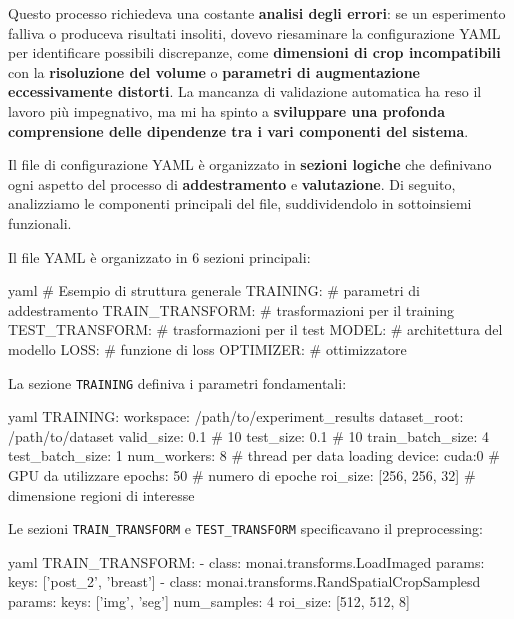 Questo processo richiedeva una costante \textbf{analisi degli errori}: se un esperimento falliva o produceva risultati insoliti, dovevo riesaminare la configurazione YAML per identificare possibili discrepanze, come \textbf{dimensioni di crop incompatibili} con la \textbf{risoluzione del volume} o \textbf{parametri di augmentazione eccessivamente distorti}. La mancanza di validazione automatica ha reso il lavoro più impegnativo, ma mi ha spinto a \textbf{sviluppare una profonda comprensione delle dipendenze tra i vari componenti del sistema}.


Il file di configurazione YAML è organizzato in \textbf{sezioni logiche} che definivano ogni aspetto del processo di \textbf{addestramento} e \textbf{valutazione}. Di seguito, analizziamo le componenti principali del file, suddividendolo in sottoinsiemi funzionali.

Il file YAML è organizzato in 6 sezioni principali:

\begin{code}{yaml}
# Esempio di struttura generale
TRAINING:
  # parametri di addestramento
TRAIN_TRANSFORM:
  # trasformazioni per il training
TEST_TRANSFORM:
  # trasformazioni per il test
MODEL:
  # architettura del modello
LOSS:
  # funzione di loss
OPTIMIZER:
  # ottimizzatore
\end{code}

La sezione \texttt{TRAINING} definiva i parametri fondamentali:

\begin{code}{yaml}
TRAINING:
  workspace: /path/to/experiment_results
  dataset_root: /path/to/dataset
  valid_size: 0.1  # 10%
  test_size: 0.1   # 10%
  train_batch_size: 4
  test_batch_size: 1 
  num_workers: 8    # thread per data loading
  device: cuda:0    # GPU da utilizzare
  epochs: 50        # numero di epoche
  roi_size: [256, 256, 32]  # dimensione regioni di interesse
\end{code}


Le sezioni \texttt{TRAIN\_TRANSFORM} e \texttt{TEST\_TRANSFORM} specificavano il preprocessing:

\begin{code}{yaml}
TRAIN_TRANSFORM:
  - class: monai.transforms.LoadImaged
    params:
      keys: ['post_2', 'breast']
  - class: monai.transforms.RandSpatialCropSamplesd
    params:
      keys: ['img', 'seg']
      num_samples: 4
      roi_size: [512, 512, 8]
\end{code}


